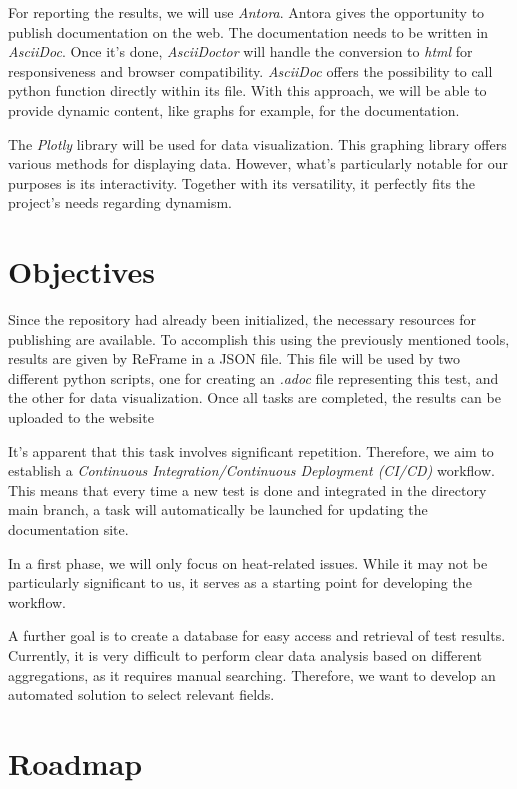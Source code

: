 \documentclass[12pt]{article}
\begin{document}
For reporting the results, we will use \textit{Antora}\cite*{Antora}. Antora gives the opportunity to publish documentation on the web.
The documentation needs to be written in \textit{AsciiDoc}. Once it's done, \textit{AsciiDoctor} will handle the conversion to \textit{html}
for responsiveness and browser compatibility.
\textit{AsciiDoc} offers the possibility to call python function directly within its file. With this approach, we will be able to provide dynamic content,
like graphs for example, for the documentation.

\newpage
The \textit{Plotly} library will be used for data visualization. This graphing library offers various methods for displaying data. However,
what's particularly notable for our purposes is its interactivity. Together with its versatility, it perfectly fits the project's needs
regarding dynamism.


\section{Objectives}
Since the repository had already been initialized, the necessary resources for publishing are available.
To accomplish this using the previously mentioned tools, results are given by ReFrame in a JSON file.
This file will be used by two different python scripts,
one for creating an \textit{.adoc} file representing this test, and the other for data visualization.
Once all tasks are completed, the results can be uploaded to the website

It's apparent that this task involves significant repetition. Therefore, we aim to establish a \textit{Continuous Integration/Continuous Deployment (CI/CD)} workflow.
This means that every time a new test is done and integrated in the directory main branch, a task will automatically be launched for updating the documentation site.

In a first phase, we will only focus on heat-related issues. While it may not be particularly significant to us,
it serves as a starting point for developing the workflow.

A further goal is to create a database for easy access and retrieval of test results.
Currently, it is very difficult to perform clear data analysis based on different aggregations, as it requires manual searching.
Therefore, we want to develop an automated solution to select relevant fields.

\newpage
\section{Roadmap}
\end{document}
